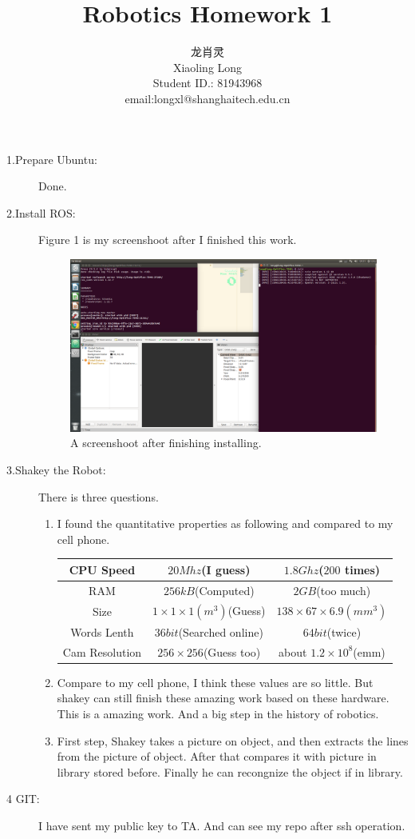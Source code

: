 \documentclass{article}
\title{Robotics Homework 1}
\author{龙肖灵 \\Xiaoling Long\\Student ID.: 81943968\\email:longxl@shanghaitech.edu.cn}
\begin{document}
\maketitle
\begin{description}
  \item[1.Prepare Ubuntu:] Done.
  \item[2.Install ROS:]
  Figure 1 is my screenshoot after I finished this work.
  \begin{figure}[h]
    \centering
    \includegraphics[width=\textwidth]{hw1.png}
    \caption{A screenshoot after finishing installing.}
    \label{fig:mesh1}
   \end{figure}
   \item[3.Shakey the Robot:]There is three questions.
   \begin{enumerate}
     \item I found the quantitative properties as following and compared to my cell phone.
    \begin{center}
       \begin{tabular}{|c | c | c|}
       \hline
       CPU Speed & $20 Mhz$(I guess) & $1.8Ghz$($200$ times) \\
       \hline
       RAM & $256 kB$(Computed) & $2GB$(too much) \\
       \hline
       Size & $1 \times1 \times1 (m^3)$(Guess) & $138\times 67\times 6.9(mm^3)$\\
       \hline
       Words Lenth & $36 bit$(Searched online) & $64bit$(twice)\\
       \hline
       Cam Resolution & $256\times 256$(Guess too) & about $1.2\times 10^8$(emm)\\ [1ex]
       \hline
      \end{tabular}
    \end{center}
    \item Compare to my cell phone, I think these values are so little. But shakey can still
    finish these amazing work based on these hardware. This is a amazing work. And a big step
    in the history of robotics.
    \item First step, Shakey takes a picture on object, and then extracts the lines from the
    picture of object. After that compares it with picture in library stored before. Finally
    he can recongnize the object if in library.
   \end{enumerate}
   \item[4 GIT:] I have sent my public key to TA. And can see my repo after ssh operation.
\end{description}
\end{document}
